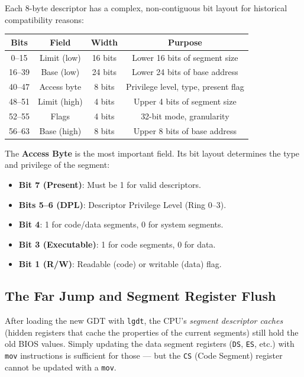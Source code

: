 \documentclass[12pt,a4paper]{report}
\begin{document}
Each 8-byte descriptor has a complex, non-contiguous bit layout for historical
compatibility reasons:

\begin{center}
\begin{tabular}{|c|c|c|c|}
\hline
\textbf{Bits} & \textbf{Field} & \textbf{Width} & \textbf{Purpose} \\
\hline
0--15   & Limit (low)  & 16 bits & Lower 16 bits of segment size \\
16--39  & Base (low)   & 24 bits & Lower 24 bits of base address \\
40--47  & Access byte  & 8 bits  & Privilege level, type, present flag \\
48--51  & Limit (high) & 4 bits  & Upper 4 bits of segment size \\
52--55  & Flags        & 4 bits  & 32-bit mode, granularity \\
56--63  & Base (high)  & 8 bits  & Upper 8 bits of base address \\
\hline
\end{tabular}
\end{center}

The \textbf{Access Byte} is the most important field. Its bit layout determines
the type and privilege of the segment:
\begin{itemize}
    \item \textbf{Bit 7 (Present)}: Must be 1 for valid descriptors.
    \item \textbf{Bits 5--6 (DPL)}: Descriptor Privilege Level (Ring 0--3).
    \item \textbf{Bit 4}: 1 for code/data segments, 0 for system segments.
    \item \textbf{Bit 3 (Executable)}: 1 for code segments, 0 for data.
    \item \textbf{Bit 1 (R/W)}: Readable (code) or writable (data) flag.
\end{itemize}

\subsection{The Far Jump and Segment Register Flush}

After loading the new GDT with \texttt{lgdt}, the CPU's \textit{segment descriptor
caches} (hidden registers that cache the properties of the current segments) still
hold the old BIOS values. Simply updating the data segment registers (\texttt{DS},
\texttt{ES}, etc.) with \texttt{mov} instructions is sufficient for those --- but
the \texttt{CS} (Code Segment) register cannot be updated with a \texttt{mov}.
\end{document}
